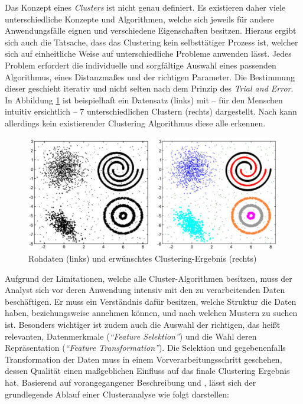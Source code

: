 Das Konzept eines \textit{Clusters} ist nicht genau definiert. Es existieren daher viele unterschiedliche Konzepte
und Algorithmen, welche sich jeweils für andere Anwendungsfälle eignen und verschiedene Eigenschaften
besitzen. Hieraus ergibt sich auch die Tatsache, dass das Clustering kein selbsttätiger Prozess ist, welcher sich auf
einheitliche Weise auf unterschiedliche Probleme anwenden lässt. Jedes Problem erfordert die individuelle und sorgfältige
Auswahl eines passenden Algorithmus, eines Distanzmaßes und der richtigen Parameter. Die Bestimmung dieser geschieht
iterativ und nicht selten nach dem Prinzip des \textit{Trial and Error}. In Abbildung \ref{fig:grund_clustering_example}
ist beispielhaft ein Datensatz (links) mit -- für den Menschen intuitiv ersichtlich -- 7 unterschiedlichen Clustern (rechts)
dargestellt. Nach \cite[]{Jain2010} kann allerdings kein existierender Clustering Algorithmus diese alle erkennen.
\cite[]{Jain1999, tan2007introduction}

\begin{figure}[H]
    \centering
    \includegraphics[width=0.8\linewidth]{resources/img/grundlagen/clustering_example}
    \caption[Rohdaten (links) und erwünschtes Clustering-Ergebnis (rechts)]{Rohdaten (links) und erwünschtes Clustering-Ergebnis (rechts) \cite[]{Jain2010}}
    \label{fig:grund_clustering_example}
\end{figure}

Aufgrund der Limitationen, welche alle Cluster-Algorithmen besitzen, muss der Analyst sich vor deren Anwendung intensiv
mit den zu verarbeitenden Daten beschäftigen. Er muss ein Verständnis dafür besitzen, welche Struktur die Daten
haben, beziehungsweise annehmen können, und nach welchen Mustern zu suchen ist.
Besonders wichtiger ist zudem auch die Auswahl der richtigen, das heißt relevanten, Datenmerkmale (\textit{``Feature Selektion''})
und die Wahl deren Repräsentation (\textit{``Feature Transformation''}).
Die Selektion und gegebenenfalls Transformation der Daten muss in einem
Vorverarbeitungsschritt geschehen, dessen Qualität einen maßgeblichen Einfluss auf das finale Clustering Ergebnis hat.
Basierend auf vorangegangener Beschreibung und \cite[]{Jain1999}, lässt sich der grundlegende Ablauf einer Clusteranalyse wie folgt darstellen: \\

